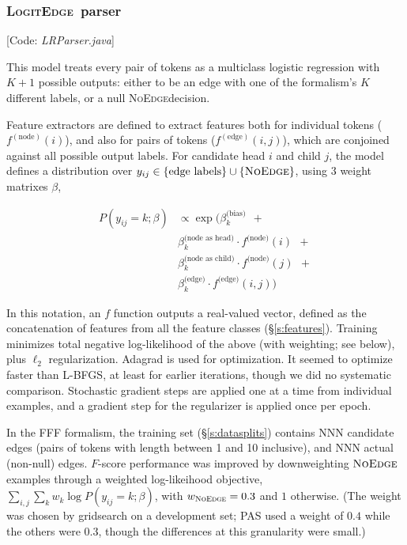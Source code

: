 \documentclass[11pt]{article}
\newcommand{\codenote}[1]{\textcolor{PineGreen}{[Code: \emph{#1}]}}
\newcommand{\logitedge}{\textsc{LogitEdge}}
\newcommand{\noedge}{\textsc{NoEdge}}
\begin{document}
\subsubsection{\logitedge\ parser} \label{s:logitedge}


\codenote{LRParser.java}

\noindent
This model treats every pair of tokens as a multiclass logistic regression
with $K+1$ possible outputs:
either to be an edge with one of the formalism's $K$ different labels, or a null
\noedge decision.  

Feature extractors are defined to extract features both for individual tokens ($f^{(\text{node})}(i)$), and also for pairs of tokens ($f^{(\text{edge})}(i,j)$), which are conjoined against all possible output labels.
For candidate head $i$ and child $j$, the model defines a distribution over
$y_{ij} \in \{\text{edge labels}\} \cup \{\noedge\}$, using $3$ weight matrixes
$\beta$,

\begin{align*} 
  P(y_{ij}=k; \beta) & \propto 
  \exp \big( \beta^{\text{(bias)}}_k \ \ + \\
  &
  \beta^{\text{(node as head)}}_k \cdot f^{\text{(node)}}(i)
  \ \ + \\ 
  &
  \beta^{\text{(node as child)}}_k \cdot f^{\text{(node)}}(j)
  \ \ + \\
  &
  \beta^{\text{(edge)}}_k \cdot f^{\text{(edge)}}(i,j)
    \big)
\end{align*}

\noindent
In this notation, an $f$ function outputs a real-valued vector, defined as the concatenation of features from all the feature classes (\S\ref{s:features}).
Training minimizes total negative log-likelihood of the above (with weighting; see below),
plus $\ell_2$ regularization.  Adagrad \cite{duchi_adaptive_2011} is used for optimization.
It seemed to optimize faster than L-BFGS, at least for earlier iterations, though we did no systematic comparison. Stochastic gradient steps are applied one at a time from individual examples, and a gradient step for the regularizer is applied once per epoch.

In the FFF formalism, the training set (\S\ref{s:datasplits})
contains NNN candidate edges (pairs of tokens with length between 1 and 10 inclusive),
and NNN actual (non-null) edges.  $F$-score performance was improved by
downweighting $\noedge$ examples through a weighted log-likeihood objective,
$\sum_{i,j} \sum_k w_k \log P(y_{ij}=k;\beta)$, with $w_{\noedge}=0.3$ and $1$ otherwise.  
(The weight was chosen by gridsearch on a development set; 
PAS used a weight of $0.4$ while the others were $0.3$, though the differences at this granularity were small.)
\end{document}
